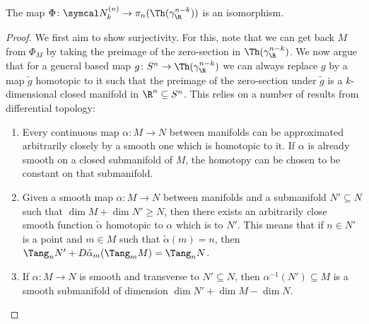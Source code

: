 \begin{theorem}	
	The map $\Phi\colon \Bord_k^{(n)} \to \pi_n(\Th(\gamma_\R^{n - k}))$ is an isomorphism.
\end{theorem}
\begin{proof}
	We first aim to show surjectivity.
	For this, note that we can get back $M$ from $\Phi_M$ by taking the preimage of the zero-section in $\Th(\gamma_\R^{n - k})$.
	We now argue that for a general based map $g\colon S^n \to \Th(\gamma_\R^{n - k})$ we can always replace $g$ by a map $\tilde{g}$ homotopic to it such that the preimage of the zero-section under $\tilde{g}$ is a $k$-dimensional closed manifold in $\R^n \subseteq S^n$.
	This relies on a number of results from differential topology:
	\begin{proposition}
		\leavevmode
		\begin{enumerate}
			\item Every continuous map $\alpha\colon M \to N$ between manifolds can be approximated arbitrarily closely by a smooth one which is homotopic to it.
				If $\alpha$ is already smooth on a closed submanifold of $M$, the homotopy can be chosen to be constant on that submanifold.
			\item Given a smooth map $\alpha\colon M \to N$ between manifolds and a submanifold $N' \subseteq N$ such that $\dim M + \dim N' \geq N$, then there exists an arbitrarily close smooth function $\tilde{\alpha}$ homotopic to $\alpha$ which is  to $N'$.
				This means that if $n \in N'$ is a point and $m \in M$ such that $\tilde{\alpha}(m) = n$, then $\Tang_n N' + D \tilde{\alpha}_m (\Tang_m M) = \Tang_n N$.
			\item If $\alpha\colon M \to N$ is smooth and transverse to $N' \subseteq N$, then $\alpha^{-1}(N') \subseteq M$ is a smooth submanifold of dimension $\dim N' + \dim M - \dim N$.
		\end{enumerate}
	\end{proposition}
\end{proof}
